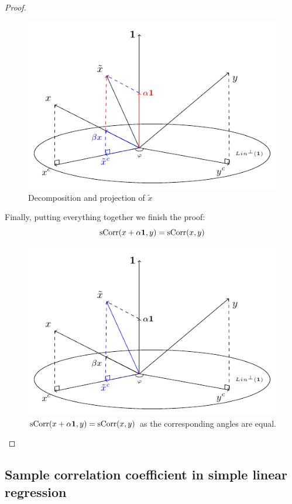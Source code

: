\begin{proof}
\begin{figure}
  \centering
  \includegraphics{figures/02_correlation_constant_decomposition.pdf}
  \caption{Decomposition and projection of $\tilde x$}
  \label{fig:corr_tildex}
\end{figure}

Finally, putting everything together we finish the proof:
\[
\operatorname{sCorr}(x + \alpha \mathbf{1}, y) = \operatorname{sCorr}(x,y)
\]

\begin{figure}
  \centering
  \includegraphics{figures/02_correlation_constant_proof.pdf}
  \caption{$\operatorname{sCorr}(x + \alpha \mathbf{1}, y) = \operatorname{sCorr}(x,y)$ as the corresponding angles are equal.}
  \label{fig:corr_final}
\end{figure}


\end{proof}

\subsection{Sample correlation coefficient in simple linear regression}


